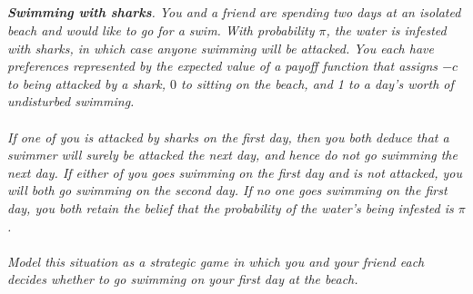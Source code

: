 \documentclass[12pt]{amsart}
\begin{document}
\subsection{}
\textit{\textbf{Swimming with sharks}. You and a friend are spending two days at an isolated beach and
	would like to go for a swim. With probability $\pi$, the water is infested with sharks, in which
	case anyone swimming will be attacked. You each have preferences represented by the
	expected value of a payoff function that assigns $-c$ to being attacked by a shark, $0$ to sitting
	on the beach, and 1 to a day’s worth of undisturbed swimming. \\ \\
	If one of you is attacked by sharks on the first day, then you both deduce that a swimmer
	will surely be attacked the next day, and hence do not go swimming the next day. If either
	of you goes swimming on the first day and is not attacked, you will both go swimming on
	the second day. If no one goes swimming on the first day, you both retain the belief that
	the probability of the water’s being infested is $\pi$. \\ \\
	Model this situation as a strategic game in which you and your friend each decides whether
	to go swimming on your first day at the beach.}
\end{document}
